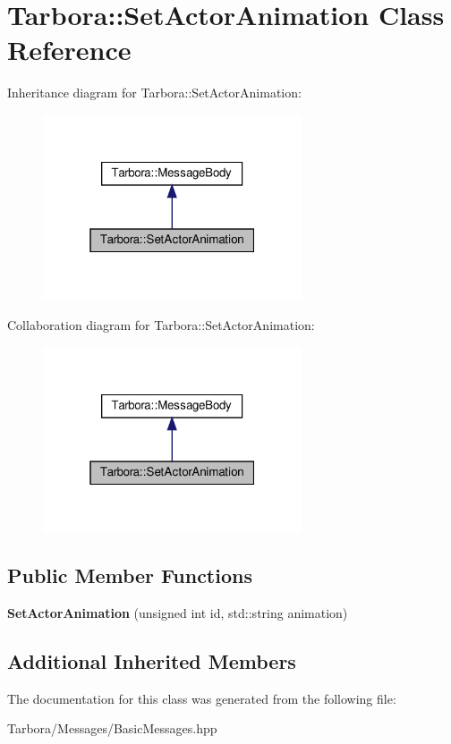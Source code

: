 \hypertarget{classTarbora_1_1SetActorAnimation}{}\section{Tarbora\+:\+:Set\+Actor\+Animation Class Reference}
\label{classTarbora_1_1SetActorAnimation}


Inheritance diagram for Tarbora\+:\+:Set\+Actor\+Animation\+:
\nopagebreak
\begin{figure}[H]
\begin{center}
\leavevmode
\includegraphics[width=217pt]{classTarbora_1_1SetActorAnimation__inherit__graph}
\end{center}
\end{figure}


Collaboration diagram for Tarbora\+:\+:Set\+Actor\+Animation\+:
\nopagebreak
\begin{figure}[H]
\begin{center}
\leavevmode
\includegraphics[width=217pt]{classTarbora_1_1SetActorAnimation__coll__graph}
\end{center}
\end{figure}
\subsection*{Public Member Functions}
\begin{DoxyCompactItemize}
\item 
\mbox{\label{classTarbora_1_1SetActorAnimation_a815f753e9ef3495b88d19163cc532e58}} 
{\bfseries Set\+Actor\+Animation} (unsigned int id, std\+::string animation)
\end{DoxyCompactItemize}
\subsection*{Additional Inherited Members}


The documentation for this class was generated from the following file\+:\begin{DoxyCompactItemize}
\item 
Tarbora/\+Messages/Basic\+Messages.\+hpp\end{DoxyCompactItemize}
